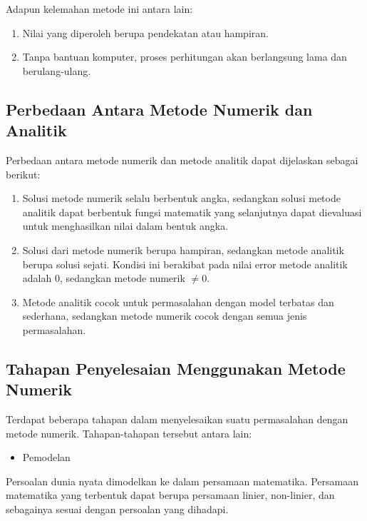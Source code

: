 \documentclass[]{book}
\providecommand{\tightlist}{%
  \setlength{\itemsep}{0pt}\setlength{\parskip}{0pt}}
\theoremstyle{definition}
\theoremstyle{definition}
\theoremstyle{definition}
\theoremstyle{remark}
\begin{document}
Adapun kelemahan metode ini antara lain:

\begin{enumerate}
\def\labelenumi{\arabic{enumi}.}
\tightlist
\item
  Nilai yang diperoleh berupa pendekatan atau hampiran.
\item
  Tanpa bantuan komputer, proses perhitungan akan berlangsung lama dan berulang-ulang.
\end{enumerate}

\hypertarget{diffanalitycnumeric}{%
\subsection{Perbedaan Antara Metode Numerik dan Analitik}\label{diffanalitycnumeric}}

Perbedaan antara metode numerik dan metode analitik dapat dijelaskan sebagai berikut:

\begin{enumerate}
\def\labelenumi{\arabic{enumi}.}
\item
  Solusi metode numerik selalu berbentuk angka, sedangkan solusi metode analitik dapat berbentuk fungsi matematik yang selanjutnya dapat dievaluasi untuk menghasilkan nilai dalam bentuk angka.
\item
  Solusi dari metode numerik berupa hampiran, sedangkan metode analitik berupa solusi sejati. Kondisi ini berakibat pada nilai error metode analitik adalah 0, sedangkan metode numerik \(\neq 0\).
\item
  Metode analitik cocok untuk permasalahan dengan model terbatas dan sederhana, sedangkan metode numerik cocok dengan semua jenis permasalahan.
\end{enumerate}

\hypertarget{tahapan-penyelesaian-menggunakan-metode-numerik}{%
\subsection{Tahapan Penyelesaian Menggunakan Metode Numerik}\label{tahapan-penyelesaian-menggunakan-metode-numerik}}

Terdapat beberapa tahapan dalam menyelesaikan suatu permasalahan dengan metode numerik. Tahapan-tahapan tersebut antara lain:

\begin{itemize}
\tightlist
\item
  Pemodelan
\end{itemize}

Persoalan dunia nyata dimodelkan ke dalam persamaan matematika. Persamaan matematika yang terbentuk dapat berupa persamaan linier, non-linier, dan sebagainya sesuai dengan persoalan yang dihadapi.
\end{document}
